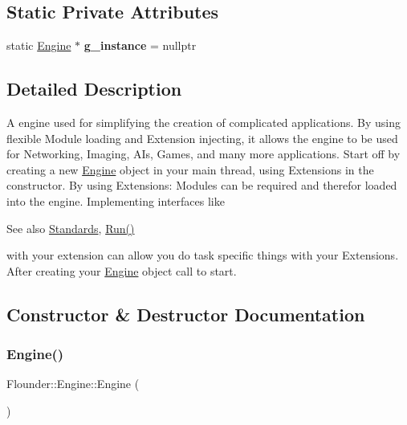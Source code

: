 \subsection*{Static Private Attributes}
\begin{DoxyCompactItemize}
\item 
\mbox{\label{class_flounder_1_1_engine_ae3faca7a13fc6b930024f59a56592c86}} 
static \hyperlink{class_flounder_1_1_engine}{Engine} $\ast$ {\bfseries g\+\_\+instance} = nullptr
\end{DoxyCompactItemize}


\subsection{Detailed Description}
A engine used for simplifying the creation of complicated applications. By using flexible Module loading and Extension injecting, it allows the engine to be used for Networking, Imaging, A\+Is, Games, and many more applications. Start off by creating a new \hyperlink{class_flounder_1_1_engine}{Engine} object in your main thread, using Extensions in the constructor. By using Extensions\+: Modules can be required and therefor loaded into the engine. Implementing interfaces like \begin{DoxySeeAlso}{See also}
\hyperlink{class_flounder_1_1_standards}{Standards}, \hyperlink{class_flounder_1_1_engine_afb64e3656bdacc87a776202545d5adbf}{Run()}


\end{DoxySeeAlso}
with your extension can allow you do task specific things with your Extensions. After creating your \hyperlink{class_flounder_1_1_engine}{Engine} object call  to start. 



\subsection{Constructor \& Destructor Documentation}
\mbox{\label{class_flounder_1_1_engine_abd2648b60415ffaaae1152fa65e10937}} 
\subsubsection{\texorpdfstring{Engine()}{Engine()}}
{\footnotesize\ttfamily Flounder\+::\+Engine\+::\+Engine (\begin{DoxyParamCaption}{ }\end{DoxyParamCaption})}



